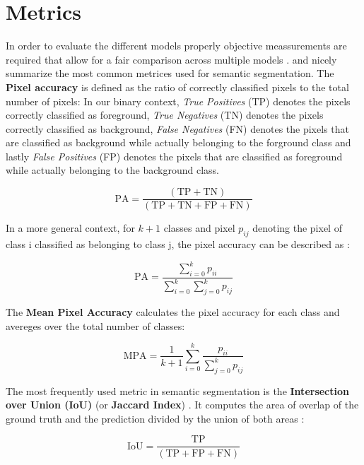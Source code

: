 \documentclass[11pt,
  paper=a4, 
  bibliography=totocnumbered,
	captions=tableheading,
	BCOR=10mm
]{scrreprt}
\theoremstyle{definition}
\newcommand{\TP}{\text{TP}}
\newcommand{\TN}{\text{TN}}
\newcommand{\FP}{\text{FP}}
\newcommand{\FN}{\text{FN}}
\begin{document}
\section{Metrics}

In order to evaluate the different models properly objective meassurements are required that allow for a fair comparison across multiple models \cite{Garcia-Garcia2018}. 
\textcite{Minaee2020} and \textcite{Garcia-Garcia2018} nicely summarize the most common metrices used for semantic segmentation.
The \textbf{Pixel accuracy} is defined as the ratio of correctly classified pixels to the total number of pixels:
In our binary context, \textit{True Positives} (TP) denotes the pixels correctly classified as foreground, 
\textit{True Negatives} (TN) denotes the pixels correctly classified as background, 
\textit{False Negatives} (FN) denotes the pixels that are classified as background while actually belonging to the forground class and lastly
\textit{False Positives} (FP) denotes the pixels that are classified as foreground while actually belonging to the background class.


\begin{equation}
	\text{PA} = \frac{(\TP + \TN)}{(\TP + \TN + \FP + \FN)}
\end{equation}

In a more general context, for $k + 1$ classes and pixel $p_{ij}$ denoting the pixel of class i classified as belonging to class j, the pixel accuracy can be described as \cite{Garcia-Garcia2018}:

\begin{equation}
	\text{PA} = \frac{\sum_{i=0}^{k}p_{ii}}{\sum_{i=0}^{k}\sum_{j=0}^{k}p_{ij}}
\end{equation}

The \textbf{Mean Pixel Accuracy} calculates the pixel accuracy for each class and avereges over the total number of classes:

\begin{equation}
	\text{MPA} = \frac{1}{k+1}\sum_{i=0}^{k}\frac{p_{ii}}{\sum_{j=0}^{k}p_{ij}}
\end{equation}


The most frequently used metric in semantic segmentation is the \textbf{Intersection over Union (IoU)} (or \textbf{Jaccard Index}) \cite{Minaee2020}.
It computes the area of overlap of the ground truth and the prediction divided by the union of both areas \cite{Garcia-Garcia2018}:

\begin{equation}
	\text{IoU} = \frac{\TP}{(\TP + \FP + \FN)}
\end{equation}
\end{document}
